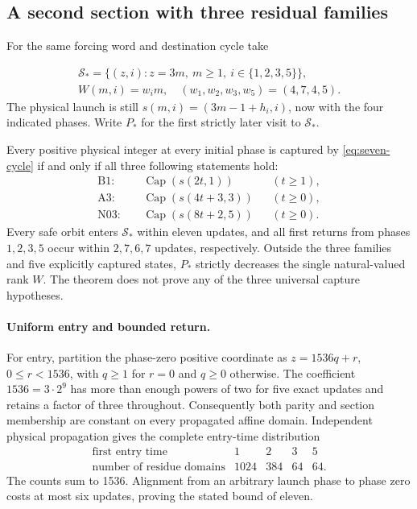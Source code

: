 \subsection{A second section with three residual families}
\label{sec:seven-three}

For the same forcing word and destination cycle take

\begin{equation}\label{eq:seven-new-section}
\begin{gathered}
 \mathcal S_* = \{(z,i):z=3m,\ m\ge1,\ i\in\{1,2,3,5\}\},
 \\
 W(m,i)=w_i m,\quad (w_1,w_2,w_3,w_5)=(4,7,4,5).
\end{gathered}
\end{equation}
The physical launch is still $s(m,i)=(3m-1+h_i,i)$, now with the
four indicated phases.  Write $P_*$ for the first strictly later visit
to $\mathcal S_*$.

\begin{theorem}\label{thm:seven-three}
Every positive physical integer at every initial phase is captured by
\eqref{eq:seven-cycle} if and only if all three following statements hold:
\begin{align*}
 \mathrm{B1}:&\quad \operatorname{Cap}(s(2t,1)) &&(t\ge1),\\
 \mathrm{A3}:&\quad \operatorname{Cap}(s(4t+3,3)) &&(t\ge0),\\
 \mathrm{N03}:&\quad \operatorname{Cap}(s(8t+2,5)) &&(t\ge0).
\end{align*}
Every safe orbit enters $\mathcal S_*$ within eleven updates, and all
first returns from phases $1,2,3,5$ occur within $2,7,6,7$ updates,
respectively.  Outside the three families and five explicitly captured
states, $P_*$ strictly decreases the single natural-valued rank $W$.
The theorem does not prove any of the three universal capture hypotheses.
\end{theorem}

\paragraph{Uniform entry and bounded return.}
For entry, partition the phase-zero positive coordinate as
$z=1536q+r$, $0\le r<1536$, with $q\ge1$ for $r=0$ and $q\ge0$
otherwise.  The coefficient $1536=3\cdot2^9$ has more than enough
powers of two for five exact updates and retains a factor of three
throughout.  Consequently both parity and section membership are
constant on every propagated affine domain.  Independent physical
propagation gives the complete entry-time distribution
\[
 \begin{array}{c|rrrr}
 \text{first entry time}&1&2&3&5\\\hline
 \text{number of residue domains}&1024&384&64&64.
 \end{array}
\]
The counts sum to 1536.  Alignment from an arbitrary launch phase to
phase zero costs at most six updates, proving the stated bound of eleven.

